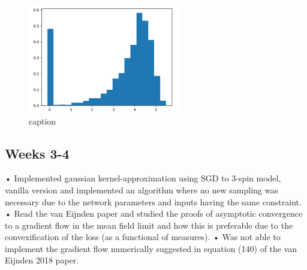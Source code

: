 \documentclass{article}
\begin{document}
\begin{figure}[H]
    \centering
    \includegraphics[width=0.6\textwidth]{images/Nguyen2018-SGD-2.png}
    \caption{ caption}
    \label{fig: label of figure}
\end{figure}

\subsection{Weeks 3-4}
•	Implemented gaussian kernel-approximation using SGD to 3-spin model, vanilla version and implemented an algorithm where no new sampling was necessary due to the network parameters and inputs having the same constraint.
•	Read the van Eijnden paper and studied the proofs of asymptotic convergence to a gradient flow in the mean field limit and how this is preferable due to the convexification of the loss (as a functional of measures).
•	Was not able to implement the gradient flow numerically suggested in equation (140) of the van Eijnden 2018 paper. 
\end{document}
